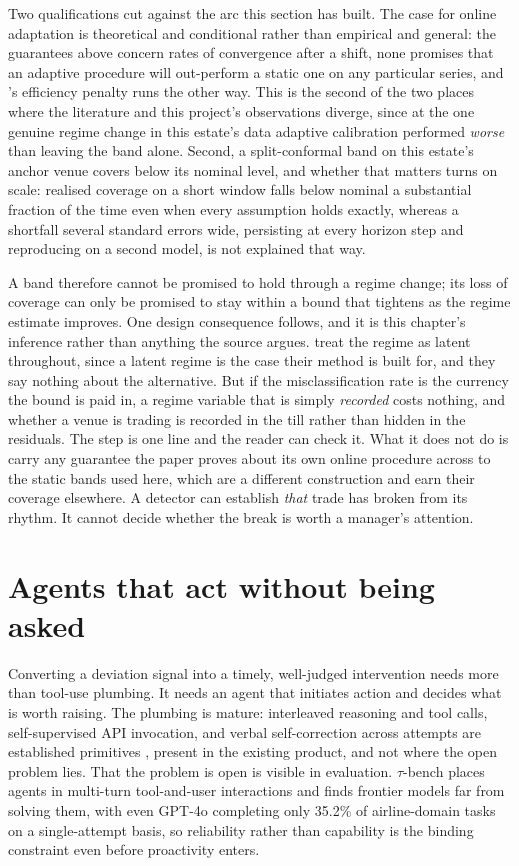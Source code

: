 Two qualifications cut against the arc this section has built. The case for
online adaptation is theoretical and conditional rather than empirical and
general: the guarantees above concern rates of convergence after a shift, none
promises that an adaptive procedure will out-perform a static one on any
particular series, and \citet{zaffran_adaptive_2022}'s efficiency penalty runs
the other way. This is the second of the two places where the literature and this
project's observations diverge, since at the one genuine regime change in this
estate's data adaptive calibration performed \emph{worse} than leaving the band
alone. Second, a split-conformal band on this estate's anchor venue covers below
its nominal level, and whether that matters turns on scale: realised coverage on
a short window falls below nominal a substantial fraction of the time even when
every assumption holds exactly, whereas a shortfall several standard errors wide,
persisting at every horizon step and reproducing on a second model, is not
explained that way.

A band therefore cannot be promised to hold through a regime change; its loss of
coverage can only be promised to stay within a bound that tightens as the regime
estimate improves. One design consequence follows, and it is this chapter's
inference rather than anything the source argues.
\citeauthor{sun_conformal_2025} treat the regime as latent throughout, since a
latent regime is the case their method is built for, and they say nothing about
the alternative. But if the misclassification rate is the currency the bound is
paid in, a regime variable that is simply \emph{recorded} costs nothing, and
whether a venue is trading is recorded in the till rather than hidden in the
residuals. The step is one line and the reader can check it. What it does not do
is carry any guarantee the paper proves about its own online procedure across to
the static bands used here, which are a different construction and earn their
coverage elsewhere. A detector can establish \emph{that} trade has broken from
its rhythm. It cannot decide whether the break is worth a manager's attention.

\section{Agents that act without being asked}
\label{sec:rw-surfacing}

Converting a deviation signal into a timely, well-judged intervention needs more
than tool-use plumbing. It needs an agent that initiates action and decides what
is worth raising. The plumbing is mature: interleaved reasoning and tool calls,
self-supervised API invocation, and verbal self-correction across attempts are
established primitives
\citep{yao_react_2022,schick_toolformer_2023,shinn_reflexion_2023}, present in
the existing product, and not where the open problem lies. That the problem is
open is visible in evaluation. $\tau$-bench
\citep[a 2024 preprint]{yao_-bench_2024} places agents in multi-turn
tool-and-user interactions and finds frontier models far from solving them, with
even GPT-4o completing only 35.2\% of airline-domain tasks on a single-attempt
basis, so reliability rather than capability is the binding constraint even
before proactivity enters.


